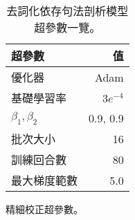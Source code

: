 \begin{table}[htbp]
\begin{subtable}[t]{.4\textwidth}
\begin{tabular}[t]{@{}lr@{}}
        超參數 & 值 \\
        \midrule
            優化器              & Adam \\
            基礎學習率          & $3e^{-4}$ \\
            $\beta_1,\beta_2$  & 0.9, 0.9 \\
            批次大小            & 16 \\
            訓練回合數          & 80 \\
            最大梯度範數        & 5.0 \\
        \bottomrule
        \end{tabular}
        \caption{
            精細校正超參數。
        }
        \label{tab:delex_finetune_hparams}
    \end{subtable}
    \caption{
        去詞化依存句法剖析模型超參數一覽。
    }
    \label{tab:delex_hparams}
\end{table}